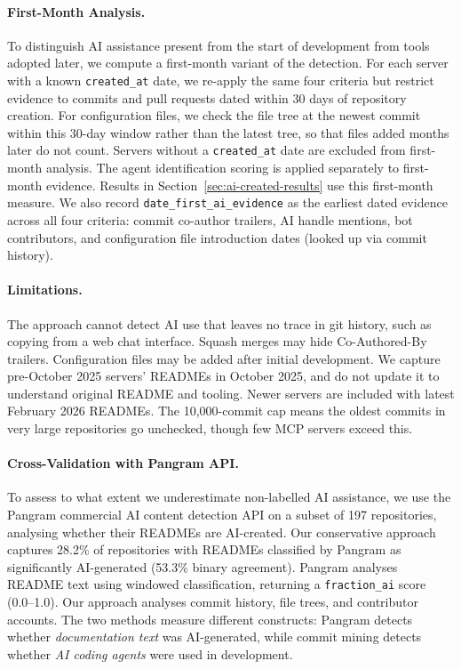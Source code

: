\documentclass[manuscript,screen,nonacm,oneside]{acmart}
\begin{document}
\paragraph{First-Month Analysis.}
To distinguish AI assistance present from the start of development from tools adopted later, we compute a first-month variant of the detection. For each server with a known \texttt{created\_at} date, we re-apply the same four criteria but restrict evidence to commits and pull requests dated within 30 days of repository creation. For configuration files, we check the file tree at the newest commit within this 30-day window rather than the latest tree, so that files added months later do not count. Servers without a \texttt{created\_at} date are excluded from first-month analysis. The agent identification scoring is applied separately to first-month evidence. Results in Section~\ref{sec:ai-created-results} use this first-month measure. We also record \texttt{date\_first\_ai\_evidence} as the earliest dated evidence across all four criteria: commit co-author trailers, AI handle mentions, bot contributors, and configuration file introduction dates (looked up via commit history).

\paragraph{Limitations.}
The approach cannot detect AI use that leaves no trace in git history, such as copying from a web chat interface. Squash merges may hide Co-Authored-By trailers. Configuration files may be added after initial development. We capture pre-October 2025 servers' READMEs in October 2025, and do not update it to understand original README and tooling. Newer servers are included with latest February 2026 READMEs. The 10,000-commit cap means the oldest commits in very large repositories go unchecked, though few MCP servers exceed this.

\paragraph{Cross-Validation with Pangram API.}
To assess to what extent we underestimate non-labelled AI assistance, we use the Pangram commercial AI content detection API on a subset of 197 repositories, analysing whether their READMEs are AI-created. Our conservative approach captures 28.2\% of repositories with READMEs classified by Pangram as significantly AI-generated (53.3\% binary agreement). Pangram analyses README text using
windowed classification, returning a \texttt{fraction\_ai} score (0.0--1.0). Our approach
analyses commit history, file trees, and contributor accounts. The two methods measure
different constructs: Pangram detects whether \emph{documentation text} was AI-generated,
while commit mining detects whether \emph{AI coding agents} were used in development.
\end{document}
